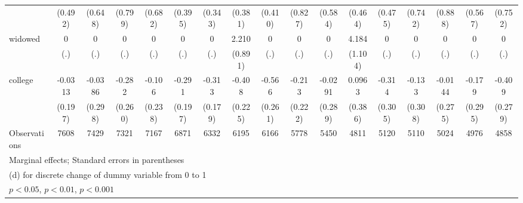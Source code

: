{\begin{tabular}{l*{16}{c}}
                    &     (0.492)         &     (0.648)         &     (0.799)         &     (0.682)         &     (0.395)         &     (0.343)         &     (0.381)         &     (0.410)         &     (0.827)         &     (0.584)         &     (0.464)         &     (0.475)         &     (0.742)         &     (0.888)         &     (0.567)         &     (0.752)         \\
[1em]
widowed             &           0         &           0         &           0         &           0         &           0         &           0         &       2.210\sym{*}  &           0         &           0         &           0         &       4.184\sym{***}&           0         &           0         &           0         &           0         &           0         \\
                    &         (.)         &         (.)         &         (.)         &         (.)         &         (.)         &         (.)         &     (0.891)         &         (.)         &         (.)         &         (.)         &     (1.104)         &         (.)         &         (.)         &         (.)         &         (.)         &         (.)         \\
[1em]
college             &     -0.0313         &     -0.0386         &      -0.282         &      -0.106         &      -0.291         &      -0.313         &      -0.408         &      -0.566\sym{*}  &      -0.213         &     -0.0291         &      0.0963         &      -0.314         &      -0.133         &     -0.0144         &      -0.179         &      -0.409         \\
                    &     (0.197)         &     (0.298)         &     (0.260)         &     (0.238)         &     (0.197)         &     (0.179)         &     (0.225)         &     (0.261)         &     (0.222)         &     (0.289)         &     (0.386)         &     (0.305)         &     (0.308)         &     (0.275)         &     (0.295)         &     (0.279)         \\
\hline
Observations        &        7608         &        7429         &        7321         &        7167         &        6871         &        6332         &        6195         &        6166         &        5778         &        5450         &        4811         &        5120         &        5110         &        5024         &        4976         &        4858         \\
\hline\hline
\multicolumn{17}{l}{\footnotesize Marginal effects; Standard errors in parentheses}\\
\multicolumn{17}{l}{\footnotesize  (d) for discrete change of dummy variable from 0 to 1}\\
\multicolumn{17}{l}{\footnotesize \sym{*} \(p<0.05\), \sym{**} \(p<0.01\), \sym{***} \(p<0.001\)}\\
\end{tabular}
}
